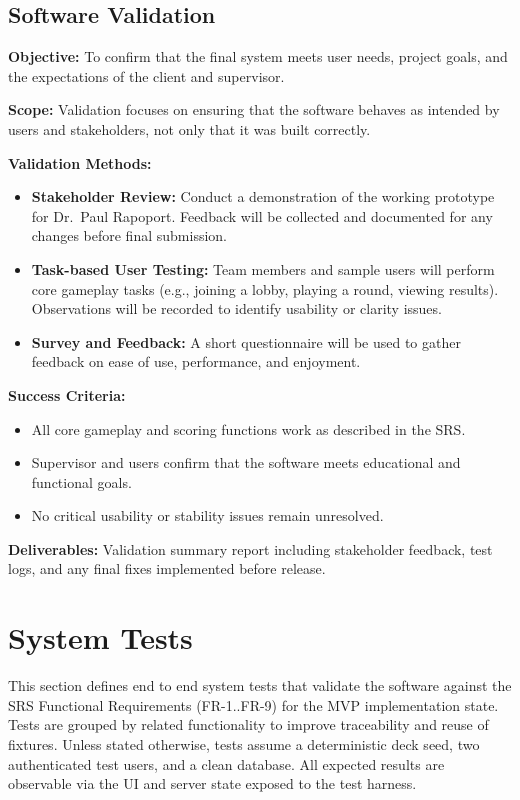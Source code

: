\documentclass[12pt, titlepage]{article}
\begin{document}
\subsection{Software Validation}

\noindent\textbf{Objective:}  
To confirm that the final system meets user needs, project goals, and the expectations of the client and supervisor.

\noindent\textbf{Scope:}  
Validation focuses on ensuring that the software behaves as intended by users and stakeholders, not only that it was built correctly.

\noindent\textbf{Validation Methods:}
\begin{itemize}
    \item \textbf{Stakeholder Review:}  
    Conduct a demonstration of the working prototype for Dr.\ Paul Rapoport.  
    Feedback will be collected and documented for any changes before final submission.
    
    \item \textbf{Task-based User Testing:}  
    Team members and sample users will perform core gameplay tasks (e.g., joining a lobby, playing a round, viewing results).  
    Observations will be recorded to identify usability or clarity issues.

    \item \textbf{Survey and Feedback:}  
    A short questionnaire will be used to gather feedback on ease of use, performance, and enjoyment.
\end{itemize}

\noindent\textbf{Success Criteria:}
\begin{itemize}
    \item All core gameplay and scoring functions work as described in the SRS.  
    \item Supervisor and users confirm that the software meets educational and functional goals.  
    \item No critical usability or stability issues remain unresolved.
\end{itemize}

\noindent\textbf{Deliverables:}  
Validation summary report including stakeholder feedback, test logs, and any final fixes implemented before release.


\section{System Tests}

This section defines end to end system tests that validate the software against the SRS Functional Requirements (FR-1..FR-9) for the MVP implementation state. Tests are grouped by related functionality to improve traceability and reuse of fixtures. Unless stated otherwise, tests assume a deterministic deck seed, two authenticated test users, and a clean database. All expected results are observable via the UI and server state exposed to the test harness.
\end{document}
